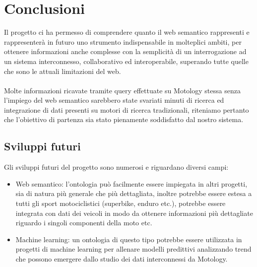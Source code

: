 \chapter{Conclusioni}

Il progetto ci ha permesso di comprendere quanto il web semantico rappresenti e rappresenterà in futuro uno strumento indispensabile in molteplici ambiti, per ottenere informazioni anche complesse con la semplicità di un interrogazione ad un sistema interconnesso, collaborativo ed interoperabile, superando tutte quelle che sono le attuali limitazioni del web.
\\\\
Molte informazioni ricavate tramite query effettuate su Motology stessa senza l'impiego del web semantico sarebbero state svariati minuti di ricerca ed integrazione di dati presenti su motori di ricerca tradizionali, riteniamo pertanto che l'obiettivo di partenza sia stato pienamente soddisfatto dal nostro sistema.

\section{Sviluppi futuri}
Gli sviluppi futuri del progetto sono numerosi e riguardano diversi campi: 

\begin{itemize}
\item Web semantico: l'ontologia può facilmente essere impiegata in altri progetti, sia di natura più generale che più dettagliata, inoltre potrebbe essere estesa a tutti gli sport motociclistici (superbike, enduro etc.), potrebbe essere integrata con dati dei veicoli in modo da ottenere informazioni più dettagliate riguardo i singoli componenti della moto etc.
\item Machine learning: un ontologia di questo tipo potrebbe essere utilizzata in progetti di machine learning per allenare modelli predittivi analizzando trend che possono emergere dallo studio dei dati interconnessi da Motology.

\end{itemize}